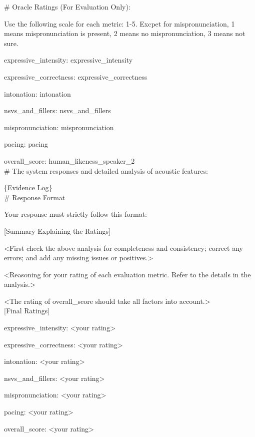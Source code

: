 \begin{tcolorbox}[gray_box, title = {{Prompt Template: Synthesizing Global Judgment CoT}}]
\# Oracle Ratings (For Evaluation Only):

Use the following scale for each metric: 1-5. Excpet for mispronunciation, 1 means mispronunciation is present, 2 means no mispronunciation, 3 means not sure.

expressive_intensity: {expressive_intensity}

expressive_correctness: {expressive_correctness}

intonation: {intonation}

nsvs_and_fillers: {nsvs_and_fillers}

mispronunciation: {mispronunciation}

pacing: {pacing}

overall_score: {human_likeness_speaker_2} \\

\# The system responses and detailed analysis of acoustic features:

\{Evidence Log\} \\

\# Response Format 

Your response must strictly follow this format:

[Summary Explaining the Ratings]

<First check the above analysis for completeness and consistency; correct any errors; and add any missing issues or positives.>

<Reasoning for your rating of each evaluation metric. Refer to the details in the analysis.>

<The rating of overall_score should take all factors into account.> \\

[Final Ratings]

expressive_intensity: <your rating>

expressive_correctness: <your rating>

intonation: <your rating>

nsvs_and_fillers: <your rating>

mispronunciation: <your rating>

pacing: <your rating>

overall_score: <your rating>
\end{tcolorbox}